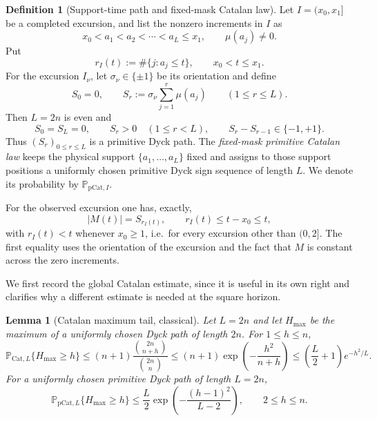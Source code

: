 \documentclass[11pt,reqno]{amsart}
\numberwithin{equation}{section}
\theoremstyle{plain}
\newtheorem{lemma}[theorem]{Lemma}
\theoremstyle{definition}
\newtheorem{definition}[theorem]{Definition}
\theoremstyle{remark}
\begin{document}
\begin{definition}[Support-time path and fixed-mask Catalan law]
\label{def:support-catalan}
Let $I=(x_0,x_1]$ be a completed excursion, and list the nonzero increments in
$I$ as
\begin{equation}
 x_0<a_1<a_2<\cdots<a_L\le x_1,
 \qquad \mu(a_j)\ne0.
\end{equation}
Put
\begin{equation}
 r_I(t):=\#\{j:a_j\le t\},\qquad x_0<t\le x_1.
\end{equation}
For the excursion $I_\nu$, let $\sigma_\nu\in\{\pm1\}$ be its orientation and define
\begin{equation}
 S_0=0,\qquad
 S_r:=\sigma_\nu\sum_{j=1}^r\mu(a_j)\qquad(1\le r\le L).
\end{equation}
Then $L=2n$ is even and
\begin{equation}
 S_0=S_L=0,\qquad S_r>0\quad(1\le r<L),\qquad
 S_r-S_{r-1}\in\{-1,+1\}.
\end{equation}
Thus $(S_r)_{0\le r\le L}$ is a primitive Dyck path.  The
\emph{fixed-mask primitive Catalan law} keeps the physical support
$\{a_1,\dots,a_L\}$ fixed and assigns to those support positions a uniformly
chosen primitive Dyck sign sequence of length $L$.  We denote its probability
by $\mathbb P_{\mathrm{pCat},I}$.
\end{definition}

For the observed excursion one has, exactly,
\begin{equation}
\label{eq:support-time-height}
 |M(t)|=S_{r_I(t)},
 \qquad
 r_I(t)\le t-x_0\le t,
\end{equation}
with $r_I(t)<t$ whenever $x_0\ge1$, i.e.\ for every excursion other than $(0,2]$.
The first equality uses the orientation of the excursion and the fact that
$M$ is constant across the zero increments.

We first record the global Catalan estimate, since it is useful in its own
right and clarifies why a different estimate is needed at the square
horizon.

\begin{lemma}[Catalan maximum tail, classical]
\label{lem:catalan-max-tail}
Let $L=2n$ and let $H_{\max}$ be the maximum of a uniformly chosen Dyck path
of length $2n$.  For $1\le h\le n$,
\begin{equation}
\label{eq:catalan-max-tail}
 \mathbb P_{\mathrm{Cat},L}\{H_{\max}\ge h\}
 \le (n+1)\frac{\binom{2n}{n+h}}{\binom{2n}{n}}
 \le (n+1)\exp\!\left(-\frac{h^2}{n+h}\right)
 \le \left(\frac L2+1\right)e^{-h^2/L}.
\end{equation}
For a uniformly chosen primitive Dyck path of length $L=2n$,
\begin{equation}
\label{eq:primitive-catalan-max-tail}
 \mathbb P_{\mathrm{pCat},L}\{H_{\max}\ge h\}
 \le \frac L2\exp\!\left(-\frac{(h-1)^2}{L-2}\right),
 \qquad 2\le h\le n.
\end{equation}
\end{lemma}
\end{document}
